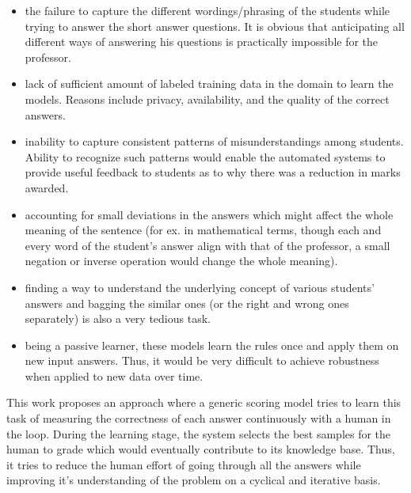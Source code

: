\documentclass[rnd]{mas_proposal}
\begin{document}
\begin{itemize}

\item the failure to capture the different wordings/phrasing of the students while trying to answer the short answer questions. It is obvious that anticipating all different ways of answering his questions is practically impossible for the professor. 

\item lack of sufficient amount of labeled training data in the domain to learn the models. Reasons include privacy, availability, and the quality of the correct answers. 

\item inability to capture consistent patterns of misunderstandings among students. Ability to recognize such patterns would enable the automated systems to provide useful feedback to students as to why there was a reduction in marks awarded.

\item accounting for small deviations in the answers which might affect the whole meaning of the sentence (for ex. in mathematical terms, though each and every word of the student's answer align with that of the professor, a small negation or inverse operation would change the whole meaning).

\item finding a way to understand the underlying concept of various students' answers and bagging the similar ones (or the right and wrong ones separately) is also a very tedious task. 

\item being a passive learner, these models learn the rules once and apply them on new input answers. Thus, it would be very difficult to achieve robustness when applied to new data over time. \\

\end{itemize}

This work proposes an approach where a generic scoring model tries to learn this task of measuring the correctness of each answer continuously with a human in the loop. During the learning stage, the system selects the best samples for the human to grade which would eventually contribute to its knowledge base. Thus, it tries to reduce the human effort of going through all the answers while improving it's understanding of the problem on a cyclical and iterative basis. \\
\end{document}
